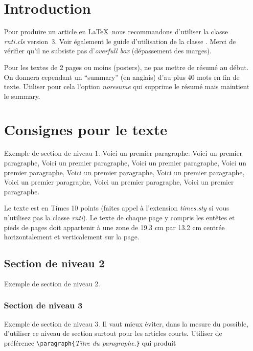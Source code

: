 \documentclass[a4paper,pagenum,french,showlayout]{rnti}
\affiliation{
    \affil{1}Univ Lyon, MINES Saint-\'Etienne, CNRS, Laboratoire Hubert Curien UMR 5516, \\F-42023 Saint-\'Etienne, France\\
          \{prenom.nom\}@emse.fr\\
    \affil{2}Autre adresse\\
          autre-adresse@email\\
          \http{http://www.une-autre-page.html}
 }
\begin{document}
%
\section{Introduction}

Pour produire un article en \LaTeX\ nous recommandons d'utiliser la
classe \textit{rnti.cls} version~3. Voir également le guide
d'utilisation de la classe \citep{ritschard:2005rnti}. Merci de
vérifier qu'il ne subsiste pas d'\emph{overfull box} (dépassement
des marges).

Pour les textes de 2 pages ou moins (posters), ne pas mettre de
résumé au début. On donnera cependant un ``summary'' (en anglais)
d'au plus 40 mots en fin de texte. Utiliser pour cela l'option
\textit{noresume} qui supprime le résumé mais maintient le summary.

\section{Consignes pour le texte}

Exemple de section de niveau 1.  Voici un premier paragraphe. Voici
un premier paragraphe, Voici un premier paragraphe, Voici un premier
paragraphe, Voici un premier paragraphe, Voici un premier
paragraphe, Voici un premier paragraphe, Voici un premier
paragraphe, Voici un premier paragraphe, Voici un premier
paragraphe.

Le texte est en Times 10 points (faites appel à l'extension
\textit{times.sty} si vous n'utilisez pas la classe \textit{rnti}).
Le texte de chaque page y compris les entêtes et pieds de pages doit
appartenir à une zone de 19.3 cm par 13.2 cm centrée horizontalement
et verticalement sur la page.


\subsection{Section de niveau 2}

Exemple de section de niveau 2.


\subsubsection{Section de niveau 3}

Exemple de section de niveau 3. Il vaut mieux éviter, dans la mesure
du possible, d'utiliser ce niveau de section surtout pour les
articles courts. Utiliser de préférence
\verb+\paragraph{+\textit{Titre du paragraphe.}\verb+}+ qui produit
\end{document}
